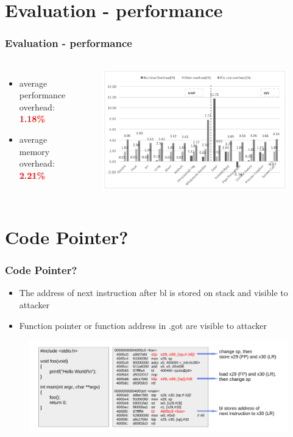 \documentclass[aspectratio=169]{beamer}
\begin{document}
\section{Evaluation - performance}
\begin{frame}
\frametitle{Evaluation - performance}
\begin{columns}[c]
\begin{itemize}
\item average performance overhead: \textbf{\textcolor{red}{1.18\%}}
\item average memory overhead: \textbf{\textcolor{red}{2.21\%}}
\end{itemize}
\begin{figure}
\includegraphics[width=1.0\linewidth]{figures/eval-performance.pdf}
\end{figure}
\end{columns}
\end{frame}


\section{Code Pointer?}
\begin{frame}
\frametitle{Code Pointer?}
\begin{itemize}
\item The address of next instruction after bl is stored on stack and visible to attacker
\item Function pointer or function address in .got are visible to attacker
\end{itemize}
\begin{figure}
\includegraphics[width=1.0\linewidth]{figures/pointer.pdf}
\end{figure}
\end{frame}
\end{document}
